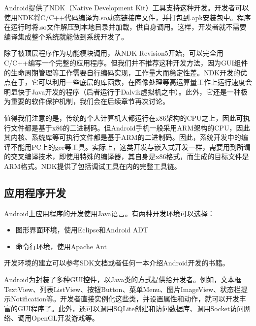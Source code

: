 Android提供了NDK（Native Development Kit）工具支持这种开发。开发者可以使用NDK将C/C++代码编译为.so动态链接库文件，并打包到.apk安装包中。程序在运行时将.so文件解压到本地目录并加载，供自身调用。这样，开发者就不需要编译集成整个系统就能做到系统开发了。

除了被顶层程序作为功能模块调用，从NDK Revision5开始，可以完全用C/C++编写一个完整的应用程序。但我们并不推荐这种开发方法，因为GUI组件的生命周期管理等工作需要自行编码实现，工作量大而稳定性差。NDK开发的优点在于，它可以利用一些底层的库函数，在图像处理等高运算量工作上运行速度会明显快于Java开发的程序（后者运行于Dalvik虚拟机之中）。此外，它还是一种极为重要的软件保护机制，我们会在后续章节再次讨论。

值得我们注意的是，传统的个人计算机大都运行在x86架构的CPU之上，因此可执行文件都是基于x86的二进制码。但Android手机一般采用ARM架构的CPU，因此其内核、系统库等可执行文件都是基于ARM的二进制码。因此，系统开发中的编译不能用PC上的gcc等工具。实际上，这类开发与嵌入式开发一样，需要用到所谓的交叉编译技术，即使用特殊的编译器，其自身是x86格式，而生成的目标文件是ARM格式。NDK提供了包括调试工具在内的完整工具链。

\subsection{应用程序开发}
Android上应用程序的开发使用Java语言。有两种开发环境可以选择：
\begin{itemize}
	\item 图形界面环境，使用Eclipse和Android ADT
	\item 命令行环境，使用Apache Ant
\end{itemize}
开发环境的建立可以参考SDK文档或者任何一本介绍Android开发的书籍。

Android为封装了多种GUI控件，以Java类的方式提供给开发者。例如，文本框TextView、列表ListView、按钮Button、菜单Menu、图片ImageView、状态栏提示Notification等。开发者直接实例化这些类，并设置属性和动作，就可以开发丰富的GUI程序了。此外，还可以调用SQLite创建和访问数据库、调用Socket访问网络、调用OpenGL开发游戏等。

